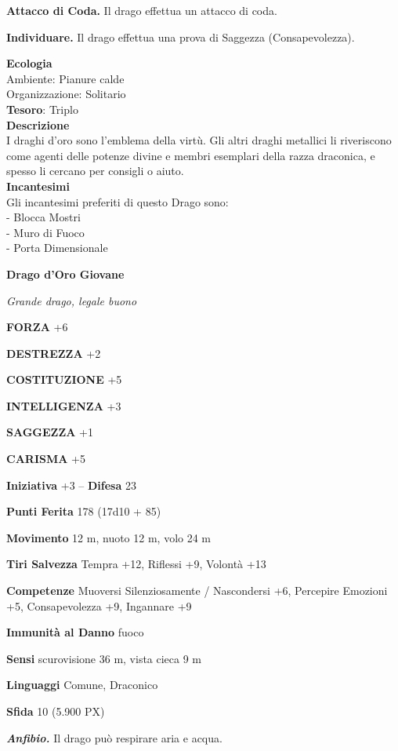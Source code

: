 \begin{multicols}{2}
\textbf{Attacco di Coda.} Il drago effettua un attacco di coda.

\textbf{Individuare.} Il drago effettua una prova di Saggezza (Consapevolezza).

\textbf{Ecologia}\\
Ambiente: Pianure calde\\
Organizzazione: Solitario\\
\textbf{Tesoro}: Triplo\\
\textbf{Descrizione}\\
I draghi d'oro sono l'emblema della virtù. Gli altri draghi metallici li riveriscono come agenti delle potenze divine e membri esemplari della razza draconica, e spesso li cercano per consigli o aiuto.\\
\textbf{Incantesimi}\\
Gli incantesimi preferiti di questo Drago sono:\\
- Blocca Mostri\\
- Muro di Fuoco\\
- Porta Dimensionale

\medskip{}\textbf{Drago d'Oro Giovane}

\textit{Grande drago, legale buono}

\textbf{FORZA} +6

\textbf{DESTREZZA} +2

\textbf{COSTITUZIONE} +5

\textbf{INTELLIGENZA} +3

\textbf{SAGGEZZA} +1

\textbf{CARISMA} +5

\textbf{Iniziativa} +3 -- \textbf{Difesa} 23

\textbf{Punti Ferita} 178 (17d10 + 85)

\textbf{Movimento} 12 m, nuoto 12 m, volo 24 m

\textbf{Tiri Salvezza} Tempra +12, Riflessi +9, Volontà +13

\textbf{Competenze} Muoversi Silenziosamente / Nascondersi +6, Percepire Emozioni +5, Consapevolezza +9, Ingannare +9

\textbf{Immunità al Danno} fuoco

\textbf{Sensi} scurovisione 36 m, vista cieca 9 m

\textbf{Linguaggi} Comune, Draconico

\textbf{Sfida} 10 (5.900 PX)

\textit{\textbf{Anfibio.}} Il drago può respirare aria e acqua.


\end{multicols}
